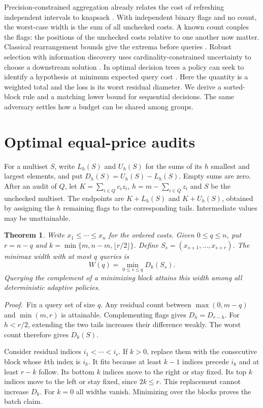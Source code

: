 \documentclass[final,5p,times,twocolumn]{elsarticle}
\newtheorem{theorem}{Theorem}
\newcommand{\proofstart}{\noindent\textit{Proof.}\ }
\begin{document}
Precision-constrained aggregation already relates the cost of refreshing independent intervals to knapsack \cite{olston}. With independent binary flags and no count, the worst-case width is the sum of all unchecked costs. A known count couples the flags: the positions of the unchecked costs relative to one another now matter. Classical rearrangement bounds give the extrema before queries \cite{cambanis}. Robust selection with information discovery uses cardinality-constrained uncertainty to choose a downstream solution \cite{chen}. In optimal decision trees a policy can seek to identify a hypothesis at minimum expected query cost \cite{zhuo}. Here the quantity is a weighted total and the loss is its worst residual diameter. We derive a sorted-block rule and a matching lower bound for sequential decisions. The same adversary settles how a budget can be shared among groups.

\section{Optimal equal-price audits}
For a multiset $S$, write $L_h(S)$ and $U_h(S)$ for the sums of its $h$ smallest and largest elements, and put $D_h(S)=U_h(S)-L_h(S)$. Empty sums are zero. After an audit of $Q$, let $K=\sum_{i\in Q}c_i z_i$, $h=m-\sum_{i\in Q}z_i$ and $S$ be the unchecked multiset. The endpoints are $K+L_h(S)$ and $K+U_h(S)$, obtained by assigning the $h$ remaining flags to the corresponding tails. Intermediate values may be unattainable.

\begin{theorem}\label{th:block}
Write $x_1\leq\cdots\leq x_n$ for the ordered costs. Given $0\leq q\leq n$, put $r=n-q$ and $k=\min\{m,n-m,\lfloor r/2\rfloor\}$. Define $S_s=(x_{s+1},\ldots,x_{s+r})$. The minimax width with at most $q$ queries is
\begin{equation}\label{eq:window}
 W(q)=\min_{0\leq s\leq q} D_k(S_s).
\end{equation}
Querying the complement of a minimizing block attains this width among all deterministic adaptive policies.
\end{theorem}
\proofstart Fix a query set of size $q$. Any residual count between $\max(0,m-q)$ and $\min(m,r)$ is attainable. Complementing flags gives $D_h=D_{r-h}$. For $h<r/2$, extending the two tails increases their difference weakly. The worst count therefore gives $D_k(S)$.

Consider residual indices $i_1<\cdots<i_r$. If $k>0$, replace them with the consecutive block whose $k$th index is $i_k$. It fits because at least $k-1$ indices precede $i_k$ and at least $r-k$ follow. Its bottom $k$ indices move to the right or stay fixed. Its top $k$ indices move to the left or stay fixed, since $2k\leq r$. This replacement cannot increase $D_k$. For $k=0$ all widths vanish. Minimizing over the blocks proves the batch claim.
\end{document}
